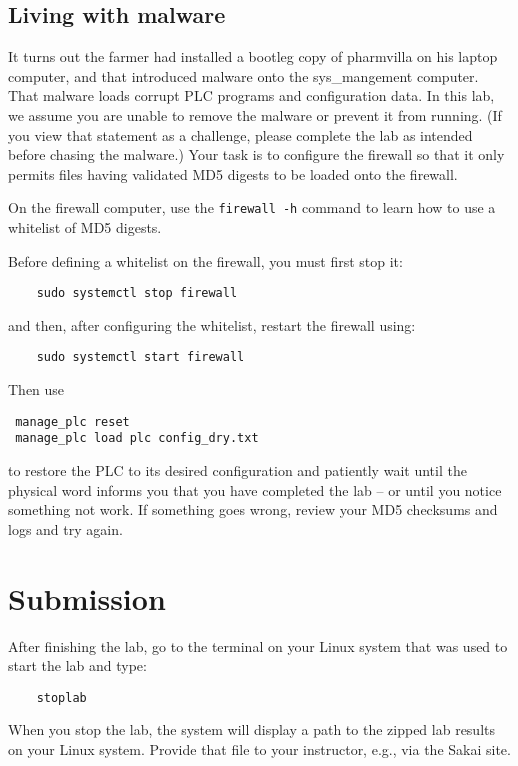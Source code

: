 \subsection{Living with malware}
It turns out the farmer had installed a bootleg copy of pharmvilla on his laptop computer, and
that introduced malware onto the sys\_mangement computer.  That malware loads corrupt PLC programs and configuration
data.  In this lab, we assume you are unable to remove the malware or prevent it from running.  (If you
view that statement as a challenge, please complete the lab as intended before chasing the malware.)
Your task is to configure the firewall so that it only permits files having validated MD5 digests to be
loaded onto the firewall.

On the firewall computer, use the {\tt firewall -h} command to learn how to use a whitelist of MD5
digests.

Before defining a whitelist on the firewall, you must first stop it:
\begin{verbatim}
    sudo systemctl stop firewall
\end{verbatim}
and then, after configuring the whitelist, restart the firewall using:
\begin{verbatim}
    sudo systemctl start firewall
\end{verbatim}
\noindent Then use
\begin{verbatim}
 manage_plc reset
 manage_plc load plc config_dry.txt
\end{verbatim}
\noindent to restore the PLC to its desired configuration and patiently wait until the physical word
informs you that you have completed the lab -- or until you notice something not work. If something
goes wrong, review your MD5 checksums and logs and try again.

\section{Submission}
After finishing the lab, go to the terminal on your Linux system that was used to start the lab and type:
\begin{verbatim}
    stoplab 
\end{verbatim}
When you stop the lab, the system will display a path to the zipped lab results on your Linux system.  Provide that file to 
your instructor, e.g., via the Sakai site.

\copyrightnotice


